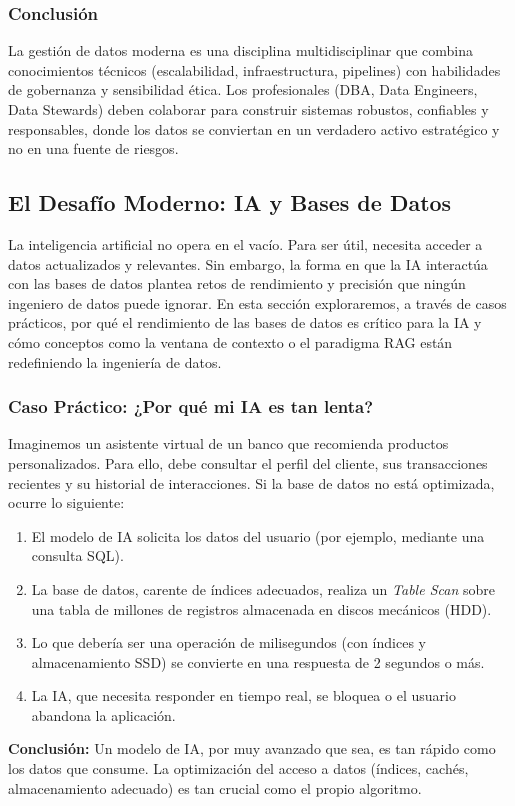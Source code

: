 \documentclass[12pt,a4paper,openany,oneside]{book}
\begin{document}
\subsubsection{Conclusión}

La gestión de datos moderna es una disciplina multidisciplinar que combina conocimientos técnicos (escalabilidad, infraestructura, pipelines) con habilidades de gobernanza y sensibilidad ética. Los profesionales (DBA, Data Engineers, Data Stewards) deben colaborar para construir sistemas robustos, confiables y responsables, donde los datos se conviertan en un verdadero activo estratégico y no en una fuente de riesgos.



\subsection{El Desafío Moderno: IA y Bases de Datos}
La inteligencia artificial no opera en el vacío. Para ser útil, necesita acceder a datos actualizados y relevantes. Sin embargo, la forma en que la IA interactúa con las bases de datos plantea retos de rendimiento y precisión que ningún ingeniero de datos puede ignorar. En esta sección exploraremos, a través de casos prácticos, por qué el rendimiento de las bases de datos es crítico para la IA y cómo conceptos como la ventana de contexto o el paradigma RAG están redefiniendo la ingeniería de datos.

\subsubsection{Caso Práctico: ¿Por qué mi IA es tan lenta?}
Imaginemos un asistente virtual de un banco que recomienda productos personalizados. Para ello, debe consultar el perfil del cliente, sus transacciones recientes y su historial de interacciones. Si la base de datos no está optimizada, ocurre lo siguiente:
\begin{enumerate}
    \item El modelo de IA solicita los datos del usuario (por ejemplo, mediante una consulta SQL).
    \item La base de datos, carente de índices adecuados, realiza un \textit{Table Scan} sobre una tabla de millones de registros almacenada en discos mecánicos (HDD).
    \item Lo que debería ser una operación de milisegundos (con índices y almacenamiento SSD) se convierte en una respuesta de 2 segundos o más.
    \item La IA, que necesita responder en tiempo real, se bloquea o el usuario abandona la aplicación.
\end{enumerate}
\textbf{Conclusión:} Un modelo de IA, por muy avanzado que sea, es tan rápido como los datos que consume. La optimización del acceso a datos (índices, cachés, almacenamiento adecuado) es tan crucial como el propio algoritmo.
\end{document}
